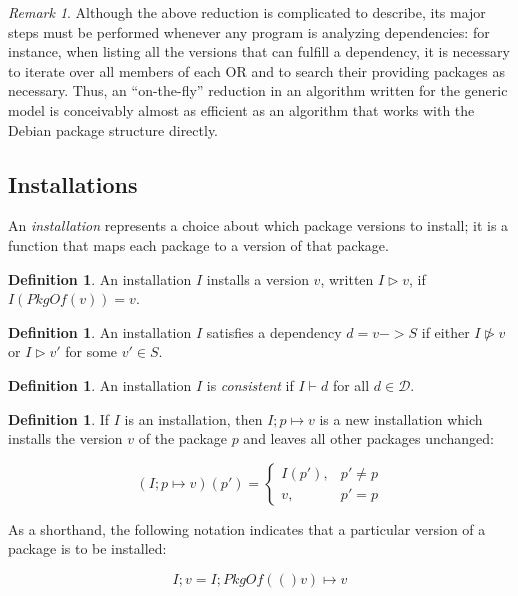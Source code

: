 \documentclass[letterpaper]{article}
\theoremstyle{definition}
\newtheorem{definition}[theorem]{Definition}
\theoremstyle{remark}
\newtheorem*{remark}{Remark}
\newcommand{\D}{\mathcal{D}}
\newcommand{\pkgof}[1]{PkgOf(#1)}
\newcommand{\installs}{\vartriangleright}
\newcommand{\satisfies}{\vdash}
\begin{document}
\begin{remark}
  Although the above reduction is complicated to describe, its major
  steps must be performed whenever any program is analyzing
  dependencies: for instance, when listing all the versions that can
  fulfill a dependency, it is necessary to iterate over all members of
  each OR and to search their providing packages as necessary.  Thus,
  an ``on-the-fly'' reduction in an algorithm written for the generic
  model is conceivably almost as efficient as an algorithm that works
  with the Debian package structure directly.
\end{remark}

\subsection{Installations}

An \emph{installation} represents a choice about which package
versions to install; it is a function that maps each package to a
version of that package.

\begin{definition}
  An installation $I$ installs a version $v$, written $I \installs v$,
  if $I(\pkgof{v})=v$.
\end{definition}

\begin{definition}
  An installation $I$ satisfies a dependency $d=v -> S$ if either $I
  \not \installs v$ or $I \installs v'$ for some $v' \in S$.
\end{definition}

\begin{definition}
  An installation $I$ is \emph{consistent} if $I \satisfies d$ for all
  $d \in \D$.
\end{definition}

\begin{definition}
  If $I$ is an installation, then $I;p \mapsto v$ is a new
  installation which installs the version $v$ of the package $p$ and
  leaves all other packages unchanged:

  \begin{equation}
    (I;p \mapsto v)(p') = \begin{cases}
      I(p'), & p' \neq p \\
      v, & p' = p
    \end{cases}
  \end{equation}

  As a shorthand, the following notation indicates that a particular
  version of a package is to be installed:

  \begin{equation}
    I;v = I;\pkgof(v) \mapsto v
  \end{equation}
\end{definition}
\end{document}
